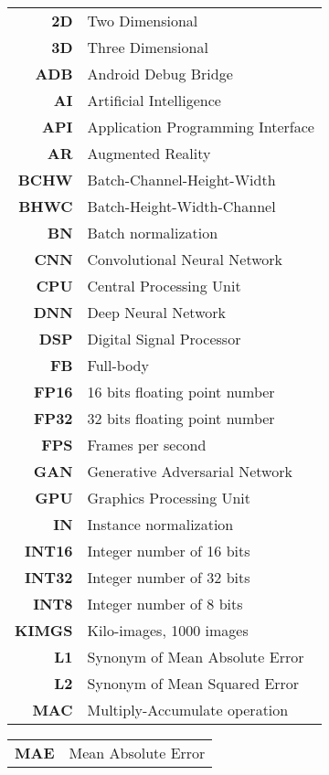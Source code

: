 \begin{changemargin}{-1.5cm}{0cm}
\begin{tabular}{@{}>{\bf}r l}
	2D & Two Dimensional \\
	3D & Three Dimensional \\
	ADB & Android Debug Bridge \\
	AI & Artificial Intelligence \\
	API & Application Programming Interface \\
	AR & Augmented Reality \\
	BCHW & Batch-Channel-Height-Width \\
	BHWC & Batch-Height-Width-Channel \\
	BN & Batch normalization \\
	CNN & Convolutional Neural Network \\
	CPU & Central Processing Unit \\
	DNN & Deep Neural Network \\
	DSP & Digital Signal Processor \\
	FB & Full-body \\
	FP16 & 16 bits floating point number \\
	FP32 & 32 bits floating point number \\
	FPS & Frames per second\\
	GAN & Generative Adversarial Network \\
	GPU & Graphics Processing Unit \\
	IN & Instance normalization \\
	INT16 & Integer number of 16 bits \\
	INT32 & Integer number of 32 bits \\
	INT8 & Integer number of 8 bits \\
	KIMGS & Kilo-images, 1000 images \\
	L1 & Synonym of Mean Absolute Error \\
	L2 & Synonym of Mean Squared Error \\
	MAC & Multiply-Accumulate operation \\
\end{tabular}
\hspace{-1em}
\begin{tabular}{>{\bf}r l@{}}
	MAE & Mean Absolute Error \\

\end{tabular}
\end{changemargin}
